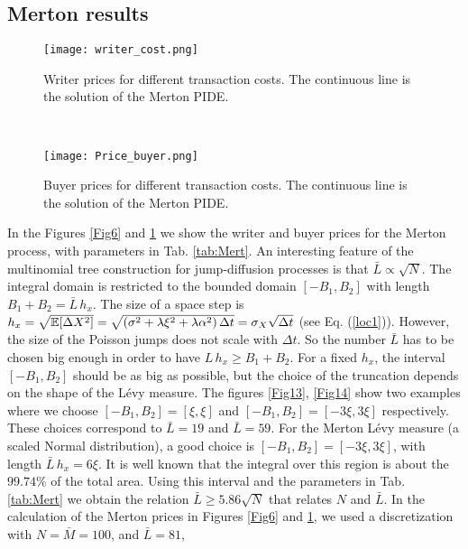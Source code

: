 \subsection{Merton results}

\begin{figure}[t!]
 \begin{minipage}[b]{0.5\linewidth}
   \centering
   \texttt{[image: writer\_cost.png]}
   \caption{Writer prices for different transaction costs. The continuous line is the solution of the Merton PIDE.}
   \label{Fig6} 
 \end{minipage}
 \ \hspace{2mm} \hspace{3mm} \
 \begin{minipage}[b]{0.5\linewidth}
  \centering
   \texttt{[image: Price\_buyer.png]}
   \caption{Buyer prices for different transaction costs. The continuous line is the solution of the Merton PIDE.}
   \label{Fig7}
 \end{minipage}
\end{figure}
In the Figures \ref{Fig6} and \ref{Fig7} we show the writer and buyer prices for the Merton process, with parameters in Tab. \ref{tab:Mert}.
An interesting feature of the multinomial tree construction for jump-diffusion processes is that $\bar L \propto \sqrt{N}$.
The integral domain is restricted to the bounded domain $[-B_1,B_2]$ with length $B_1+B_2 = \bar L \, h_x$. 
The size of a space step is $h_x = \sqrt{\mathbb{E}[\Delta X^2]} = \sqrt{( \sigma^2 + \lambda \xi^2 + \lambda \alpha^2 ) \, \Delta t}
= \sigma_X \sqrt{\Delta t}$ (see Eq. (\ref{loc1})).
However, the size of the Poisson jumps does not scale with $\Delta t$. So the number $\bar L$ has to be chosen big enough in order 
to have $L\, h_x \geq B_1+B_2$. 
For a fixed $h_x$, the interval $[-B_1,B_2]$ should be as big as possible, but the choice of the truncation depends on the shape of the L\'evy measure.  
The figures \ref{Fig13}, \ref{Fig14} show two examples where we choose $[-B_1,B_2] = [\xi,\xi]$ and $[-B_1,B_2] = [-3\xi,3\xi]$ respectively. These choices correspond to 
$\bar L = 19$ and $\bar L = 59$.
For the Merton L\'evy measure (a scaled Normal distribution), a good choice is $[-B_1,B_2] = [-3\xi,3\xi]$, with length $\bar L \, h_x = 6\xi$. 
It is well known that the integral over this region is about the $99.74\%$ of the total area.      
Using this interval and the parameters in Tab. \ref{tab:Mert} we obtain the relation $\bar L \geq 5.86 \sqrt{N}$ that relates $N$ and $\bar L$.
In the calculation of the Merton prices in Figures \ref{Fig6} and \ref{Fig7}, we used a discretization with $N=\bar M =100$, and $\bar L = 81$, 
